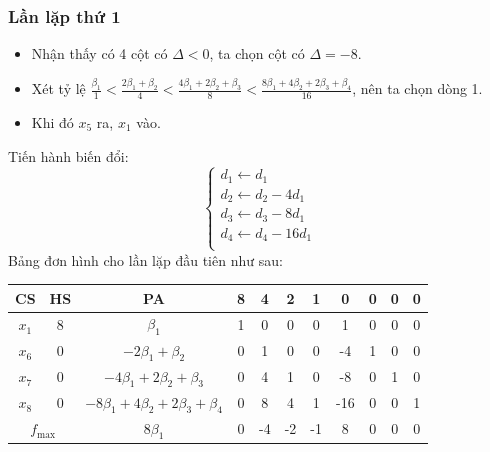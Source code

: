 \documentclass[12pt]{article}
\begin{document}
\subsubsection{Lần lặp thứ 1}
\begin{itemize}
\item Nhận thấy có 4 cột có $\Delta < 0$, ta chọn cột có $\Delta = -8$.
\item Xét tỷ lệ $\displaystyle \frac{\beta_1}{1} < \frac{2\beta_1 + \beta_2}{4} < \frac{4\beta_1 + 2\beta_2 + \beta_3}{8} < \frac{8\beta_1 + 4\beta_2 + 2\beta_3 + \beta_4}{16}$, nên ta chọn dòng 1.
\item Khi đó $x_5$ ra, $x_1$ vào.
\end{itemize}
Tiến hành biến đổi:
$$
\left\{
\begin{array}{lll}
d_1 \leftarrow d_1 \\
d_2 \leftarrow d_2 - 4d_1 \\
d_3 \leftarrow d_3 - 8d_1 \\
d_4 \leftarrow d_4 - 16d_1 \\
\end{array}
\right.
$$
Bảng đơn hình cho lần lặp đầu tiên như sau:
\begin{table}[H]
\centering
\begin{tabular}{|c|c|c|c|c|c|c|c|c|c|c|}
\hline
CS & HS & PA & 8 & 4 & 2 & 1 & 0 & 0 & 0 & 0 \\
\hline
$x_1$ & 8 & $\beta_1$ & 1 & 0 & 0 & 0 & 1 & 0 & 0 & 0 \\
$x_6$ & 0 & $-2\beta_1 + \beta_2$ & 0 & 1 & 0 & 0 & -4 & 1 & 0 & 0 \\
$x_7$ & 0 & $-4\beta_1 + 2\beta_2 + \beta_3$ & 0 & 4 & 1 & 0 & -8 & 0 & 1 & 0 \\
$x_8$ & 0 & $-8\beta_1 + 4\beta_2 + 2\beta_3 + \beta_4$ & 0 & 8 & 4 & 1 & -16 & 0 & 0 & 1 \\
\hline
\multicolumn{2}{|c|}{$f_{\max}$}
& $8\beta_1$ & 0 & -4 & -2 & -1 & 8 & 0 & 0 & 0 \\
\hline
\end{tabular}
\end{table}
\end{document}
